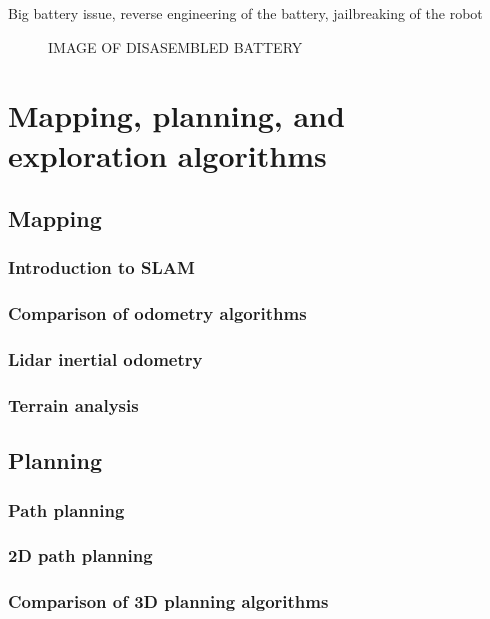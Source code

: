 \documentclass[11pt]{article}
\begin{document}
            Big battery issue, reverse engineering of the battery, jailbreaking of the robot

            \begin{figure}[H]
                \centering
                IMAGE OF DISASEMBLED BATTERY
            \end{figure}

        \newpage

    \section{Mapping, planning, and exploration algorithms}

        \subsection{Mapping}
            \subsubsection{Introduction to SLAM}
            \subsubsection{Comparison of odometry algorithms}
            \subsubsection{Lidar inertial odometry}
            \subsubsection{Terrain analysis}
        \subsection{Planning}
            \subsubsection{Path planning}
            \subsubsection{2D path planning}
            \subsubsection{Comparison of 3D planning algorithms}
\end{document}
